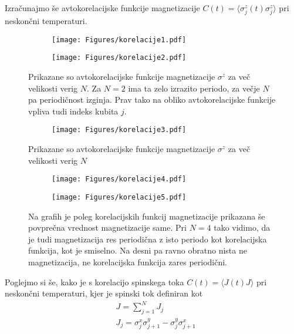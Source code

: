 \documentclass{article}
\begin{document}
Izračunajmo še avtokorelacijske funkcije magnetizacije $C(t) = \langle \sigma^z_j (t) \sigma^z_j \rangle$ pri neskončni temperaturi. 

\begin{figure}[H]
\centering
\begin{subfigure}{.49\textwidth}
\texttt{[image: Figures/korelacije1.pdf]}
\end{subfigure}
\begin{subfigure}{.49\textwidth}
\texttt{[image: Figures/korelacije2.pdf]}
\end{subfigure}
\caption*{Prikazane so avtokorelacijske funkcije magnetizacije $\sigma^z$ za več velikosti verig $N$. Za $N=2$ ima ta zelo izrazito periodo, za večje $N$ pa periodičnost izginja. Prav tako na obliko avtokorelacijske funkcije vpliva tudi indeks kubita $j$.}
\end{figure}

\begin{figure}[H]
\centering
\begin{subfigure}{.7\textwidth}
\texttt{[image: Figures/korelacije3.pdf]}
\end{subfigure}
\caption*{Prikazane so avtokorelacijske funkcije magnetizacije $\sigma^z$ za več velikosti verig $N$}
\end{figure}

\begin{figure}[H]
\centering
\begin{subfigure}{.49\textwidth}
\texttt{[image: Figures/korelacije4.pdf]}
\end{subfigure}
\begin{subfigure}{.49\textwidth}
\texttt{[image: Figures/korelacije5.pdf]}
\end{subfigure}
\caption*{Na grafih je poleg korelacijskih funkcij magnetizacije prikazana še povprečna vrednost magnetizacije same. Pri $N=4$ tako vidimo, da je tudi magnetizacija res periodična z isto periodo kot korelacijska funkcija, kot je smiselno. Na desni pa ravno obratno nista ne magnetizacija, ne korelacijska funkcija zares periodični.}
\end{figure}

Poglejmo si še, kako je s korelacijo spinskega toka $C(t) = \langle J (t) J \rangle$ pri neskončni temperaturi, kjer je spinski tok definiran kot
\begin{align*}
&J = \sum_{j=1}^N J_j \\
&J_j = \sigma^x_j \sigma^y_{j+1} - \sigma^y_j \sigma^x_{j+1}
\end{align*}
\end{document}
